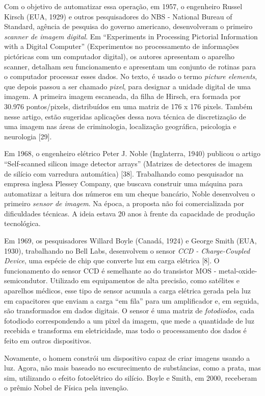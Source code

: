 \documentclass{hipatia}
\begin{document}
Com o objetivo de automatizar essa operação, em 1957, o engenheiro Russel Kirsch (EUA, 1929) e outros pesquisadores do NBS - National Bureau of Standard, agência de pesquisa do governo americano, desenvolveram o primeiro \textit{scanner de imagem digital}. Em ``Experiments in Processing Pictorial Information with a Digital Computer'' (Experimentos no processamento de informações pictóricas com um computador digital), os autores  apresentam o aparelho scanner, detalham seu funcionamento e apresentam um conjunto de rotinas para o computador processar esses dados. No texto, é usado o termo \textit{picture elements}, que depois passou a ser chamado \textit{pixel}, para designar a unidade digital de uma imagem. A primeira imagem escaneada, da filha de Hirsch, era formada por 30.976 pontos/pixels, distribuídos em uma matriz de 176 x 176 pixels. Também nesse artigo, estão sugeridas aplicações dessa nova técnica de discretização de uma imagem nas áreas de criminologia, localização geográfica, psicologia e neurologia [29].

Em 1968, o engenheiro elétrico Peter J. Noble (Inglaterra, 1940) publicou o artigo ``Self-scanned silicon image detector arrays'' (Matrizes de detectores de imagem de silício com varredura automática) [38]. Trabalhando como pesquisador na empresa inglesa Plessey Company, que buscava construir uma máquina para automatizar a leitura dos números em um cheque bancário, Noble desenvolveu o primeiro \textit{sensor de imagem}. Na época, a proposta não foi comercializada por dificuldades técnicas. A ideia estava 20 anos à frente da capacidade de produção tecnológica.

Em 1969, os pesquisadores Willard Boyle (Canadá, 1924) e George Smith (EUA, 1930), trabalhando no Bell Labs, desenvolvem o sensor \textit{CCD - Charge-Coupled Device}, uma espécie de chip que converte luz em carga elétrica [8]. O funcionamento do sensor CCD é semelhante ao do transistor MOS - metal-oxide-semicondutor. Utilizado em equipamentos de alta precisão, como satélites e aparelhos médicos, esse tipo de sensor acumula a carga elétrica gerada pela luz em capacitores que enviam a carga ``em fila'' para um amplificador e, em seguida, são transformados em dados digitais. O sensor é uma matriz de \textit{fotodiodos}, cada fotodiodo correspondendo a um pixel da imagem, que mede a quantidade de luz recebida e transforma em eletricidade, mas todo o processamento dos dados é feito em outros dispositivos.

Novamente, o homem constrói um dispositivo capaz de criar imagens usando a luz. Agora, não mais baseado no escurecimento de substâncias, como a prata, mas sim, utilizando o efeito fotoelétrico do silício. Boyle e Smith, em 2000, receberam o prêmio Nobel de Física pela invenção.
\end{document}
